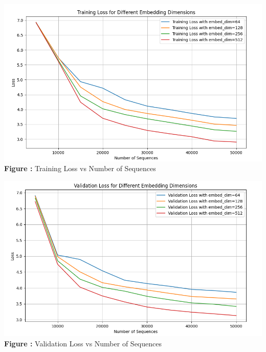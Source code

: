 \documentclass[11pt,addpoints,answers]{exam}
\begin{document}
\begin{questions}
\begin{parts}
\begin{your_solution}[height=7cm]
	\begin{minipage}{0.5\linewidth}
	\centering
	\includegraphics[width=\linewidth]{../handout/Q5_1_training.png}
	 \\ %
	{\tiny \textbf{Figure \thefigure:} Training Loss vs Number of Sequences}  %
	\label{fig:Q5_1_training}         %
	\end{minipage}
	\hfill
	\begin{minipage}{0.5\linewidth}
	\centering
	\includegraphics[width=\linewidth]{../handout/Q5_1_validation.png}
	 \\ %
	{\tiny \textbf{Figure \thefigure:} Validation Loss vs Number of Sequences} %
	\label{fig:Q5_1_validation}         %
	\end{minipage}    
\end{your_solution}


\end{parts}
\end{questions}
\end{document}
